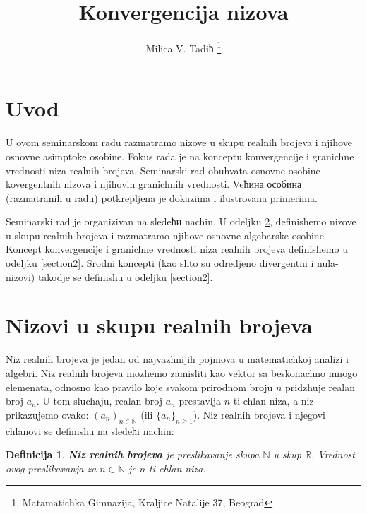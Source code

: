 \documentclass[11pt,a4paper]{article}
\newtheorem{defi}{Definicija}[section]
\newcommand{\cyr}{\fontencoding{OT2}\selectfont\selectlanguage{serbian}}
\begin{document}
\title{Konvergencija nizova} 

\author{Milica V. Tadiћ
\thanks{Matamatichka Gimnazija, Kraljice Natalije 37, Beograd  }}

\date{}

\maketitle


\section{Uvod} \label{section0}

 U ovom seminarskom radu razmatramo nizove u skupu realnih brojeva i njihove osnovne asimpto\cyr{t}\cyr{s}ke osobine. 
 Fokus rada je na konceptu konvergencije i 
 granichne vrednosti niza realnih brojeva. 
 Seminarski rad obuhvata osnovne osobine kovergentnih nizova i njihovih granichnih vrednosti. 
 Veћина особина (razmatranih u radu) 
 potkrepljena je dokazima i ilustrovana primerima. 
 
 Seminarski rad je organizivan na sledeћи nachin. 
 U odeljku \ref{section1}, definishemo  nizove u skupu realnih brojeva i razmatramo njihove osnovne algebarske osobine. 
 Koncept konvergencije i granichne vrednosti niza realnih brojeva definishemo u odeljku \ref{section2}. 
 Srodni koncepti (kao shto su odredjeno divergentni i nula-nizovi) takodje se definishu u odeljku \ref{section2}. 
 
\section{Nizovi u skupu realnih brojeva} \label{section1}

Niz realnih brojeva je jedan od najvazhnijih pojmova 
u matematichkoj analizi i algebri. 
Niz realnih brojeva mozhemo zamisliti kao vektor sa beskonachno 
mnogo elemenata, 
odnosno kao pravilo koje svakom prirodnom broju $n$
pridzhuje realan broj $a_n$. 
U tom sluchaju, realan broj $a_n$ prestavlja $n$-ti chlan niza, 
a niz prikazujemo ovako:
$(a_n)_{n\in\mathbb{N}}$ 
(ili $\{a_n\}_{n\geq 1}$). 
Niz realnih brojeva i njegovi chlanovi se definishu 
na sledeћi nachin: 

\begin{defi}
\textbf{Niz realnih brojeva} je preslikavanje skupa $\mathbb{N}$  
u skup $\mathbb{R}$. 
Vrednost ovog preslikavanja za $n\in\mathbb{N}$ je $n$-ti 
chlan niza. 
\end{defi}
\end{document}
